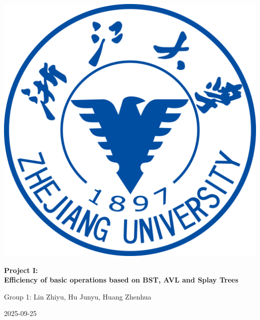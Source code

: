 \thispagestyle{empty}
\begin{titlepage}
  \centering
  \vspace*{1cm}
  \includegraphics[width=0.35\paperwidth]{images/cover.png}\par
  \vspace{2cm}
  {\Huge\bfseries Project I:\\[0.5em]Efficiency of basic operations based on BST, AVL and Splay Trees\par}
  \vspace{1.5cm}
  {\Large Group 1: Lin Zhiyu, Hu Junyu, Huang Zhenhua\par}
  \vfill
  {\large 2025-09-25\par}
\end{titlepage}
\clearpage
{}